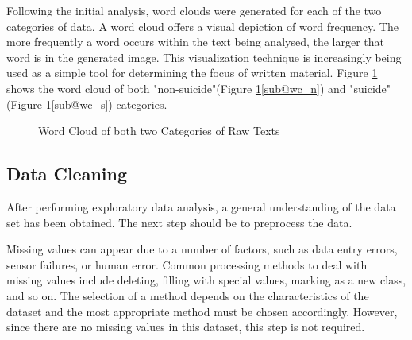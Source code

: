 \documentclass[ %
                    author={Bocheng Wang},
                supervisor={Dr. Qiang Liu},
                    degree={MSc},
                     title={A Research on Identification of Suicide Ideation in Texts with Multiple Models},
                      type={},
                      year={2024}]{dissertation}
\begin{document}
Following the initial analysis, word clouds were generated for each of the two categories of data. A word cloud offers a visual depiction of word frequency. The more frequently a word occurs within the text being analysed, the larger that word is in the generated image. This visualization technique is increasingly being used as a simple tool for determining the focus of written material.\cite{atenstaedt2012word} Figure \ref{fig:word cloud} shows the word cloud of both "non-suicide"(Figure \ref{fig:word cloud}\ref{sub@wc_n}) and "suicide"(Figure \ref{fig:word cloud}\ref{sub@wc_s}) categories.

\begin{figure}[h]
      \centering
      \hfil
      \caption{Word Cloud of both two Categories of Raw Texts}
      \label{fig:word cloud}
\end{figure}

\subsection{Data Cleaning}
\noindent
After performing exploratory data analysis, a general understanding of the data set has been obtained. The next step should be to preprocess the data.

Missing values can appear due to a number of factors, such as data entry errors, sensor failures, or human error. Common processing methods to deal with missing values include deleting, filling with special values, marking as a new class, and so on. The selection of a method depends on the characteristics of the dataset and the most appropriate method must be chosen accordingly. However, since there are no missing values in this dataset, this step is not required.
\end{document}
